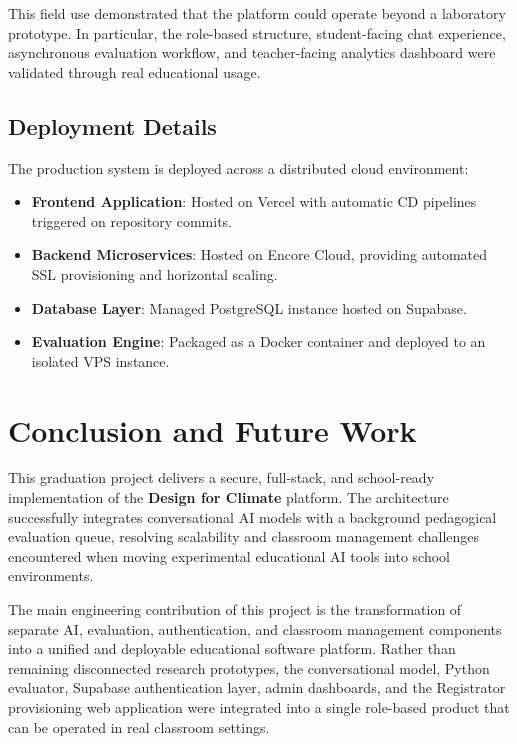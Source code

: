 \documentclass[12pt,a4paper,oneside]{report}
\begin{document}
    This field use demonstrated that the platform could operate beyond a laboratory prototype. In particular, the role-based structure, student-facing chat experience, asynchronous evaluation workflow, and teacher-facing analytics dashboard were validated through real educational usage.

    \section{Deployment Details}
    The production system is deployed across a distributed cloud environment:
    \begin{itemize}
        \item \textbf{Frontend Application}: Hosted on Vercel with automatic CD pipelines triggered on repository commits.
        \item \textbf{Backend Microservices}: Hosted on Encore Cloud, providing automated SSL provisioning and horizontal scaling.
        \item \textbf{Database Layer}: Managed PostgreSQL instance hosted on Supabase.
        \item \textbf{Evaluation Engine}: Packaged as a Docker container and deployed to an isolated VPS instance.
    \end{itemize}

    \chapter{Conclusion and Future Work}
    \label{ch:conclusion}

    This graduation project delivers a secure, full-stack, and school-ready implementation of the \textbf{Design for Climate} platform. The architecture successfully integrates conversational AI models with a background pedagogical evaluation queue, resolving scalability and classroom management challenges encountered when moving experimental educational AI tools into school environments.

    The main engineering contribution of this project is the transformation of separate AI, evaluation, authentication, and classroom management components into a unified and deployable educational software platform. Rather than remaining disconnected research prototypes, the conversational model, Python evaluator, Supabase authentication layer, admin dashboards, and the Registrator provisioning web application were integrated into a single role-based product that can be operated in real classroom settings.
\end{document}
